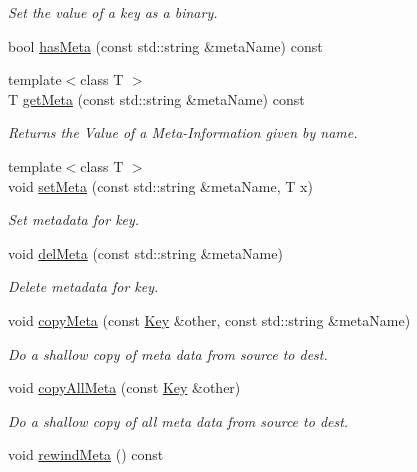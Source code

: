 \begin{DoxyCompactItemize}
\begin{DoxyCompactList}\small\item\em Set the value of a key as a binary.  \end{DoxyCompactList}\item 
bool \hyperlink{classkdb_1_1Key_abb2c472e514ecef5fedb63ecae7c0f54}{has\-Meta} (const std\-::string \&meta\-Name) const 
\item 
{\footnotesize template$<$class T $>$ }\\T \hyperlink{classkdb_1_1Key_a7a4952f9ee22e6787fc9d43507114612}{get\-Meta} (const std\-::string \&meta\-Name) const 
\begin{DoxyCompactList}\small\item\em Returns the Value of a Meta-\/\-Information given by name.  \end{DoxyCompactList}\item 
{\footnotesize template$<$class T $>$ }\\void \hyperlink{classkdb_1_1Key_a4c5a3d463127ade0b766c4298002daa3}{set\-Meta} (const std\-::string \&meta\-Name, T x)
\begin{DoxyCompactList}\small\item\em Set metadata for key. \end{DoxyCompactList}\item 
void \hyperlink{classkdb_1_1Key_a2305da805095605aca38d53f2733fb57}{del\-Meta} (const std\-::string \&meta\-Name)
\begin{DoxyCompactList}\small\item\em Delete metadata for key. \end{DoxyCompactList}\item 
void \hyperlink{classkdb_1_1Key_a53f6d2196a7f17c4bdc544207bdc5f4c}{copy\-Meta} (const \hyperlink{classkdb_1_1Key}{Key} \&other, const std\-::string \&meta\-Name)
\begin{DoxyCompactList}\small\item\em Do a shallow copy of meta data from source to dest.  \end{DoxyCompactList}\item 
void \hyperlink{classkdb_1_1Key_aec0910bf293db33deac6a3f81359cb48}{copy\-All\-Meta} (const \hyperlink{classkdb_1_1Key}{Key} \&other)
\begin{DoxyCompactList}\small\item\em Do a shallow copy of all meta data from source to dest.  \end{DoxyCompactList}\item 
void \hyperlink{classkdb_1_1Key_adf6171b76e01c2b84c6050d43673dd97}{rewind\-Meta} () const 

\end{DoxyCompactItemize}
